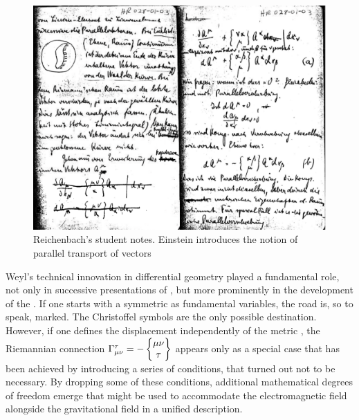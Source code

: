 \documentclass[final]{article}
\begin{document}

\begin{figure}
\begin{center}
 \includegraphics[scale=0.16, trim = 0mm 0mm 0mm 0mm, clip]{parallelverschiebungDOUB.png}
\caption{Reichenbach's student notes. Einstein introduces the notion of parallel transport of vectors}
\label{fig:parallel}
\end{center}
\end{figure}

Weyl's technical innovation in differential geometry played a fundamental role, not only in successive presentations of \gr \citep[see][45ff.]{Einstein1922}, but more prominently in the development of the \uftp. If one starts with a symmetric \gmn as fundamental variables, the road is, so to speak, marked. The Christoffel symbols are the only possible destination. However, if one defines the displacement \Gtmn independently of the metric \gmn, the Riemannian connection $\Gamma^\tau_{\mu\nu} = - \begin{Bmatrix} \mu \nu \\ \tau \end{Bmatrix}$ appears only as a special case that has been achieved by introducing a series of conditions, that turned out not to be necessary. By dropping some of these conditions, additional mathematical degrees of freedom emerge that might be used to accommodate the electromagnetic field alongside the gravitational field in a unified  description.
\end{document}
